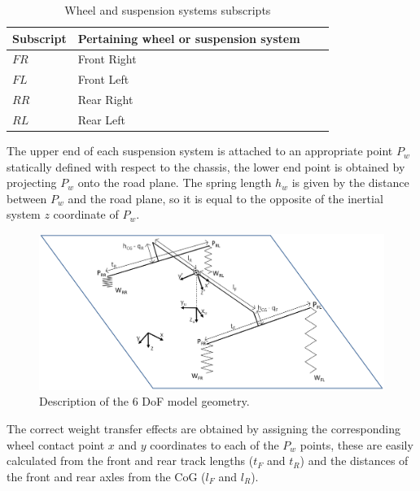 \begin{table}[ht]
  \caption{Wheel and suspension systems subscripts} %
  \centering %
  \begin{tabular}{l l l l} %
    \hline\hline %
    Subscript & Pertaining wheel or suspension system \\ [0.5ex] %
    \hline %
    $FR$ & Front Right \\ %
    $FL$ & Front Left \\
    $RR$ & Rear Right \\
    $RL$ & Rear Left \\ [1ex] %
    \hline %
  \end{tabular}
  \label{table:subscripts} %
\end{table}

The upper end of each suspension system is attached to an appropriate point $P_w$ statically defined with respect to the chassis, the lower end point is obtained by projecting $P_w$ onto the road plane.
The spring length $h_w$ is given by the distance between $P_w$ and the road plane, so it is equal to the opposite of the inertial system $z$ coordinate of $P_w$.

\begin{figure}[ht]
  \centering
  \includegraphics[width=\textwidth]{images/3dview}
  \caption{Description of the 6 DoF model geometry.}
  \label{3dview}
\end{figure}

The correct weight transfer effects are obtained by assigning the corresponding wheel contact point $x$ and $y$ coordinates to each of the $P_w$ points, these are easily calculated from the front and rear track lengths ($t_F$ and $t_R$) and the distances of the front and rear axles from the CoG ($l_F$ and $l_R$).

